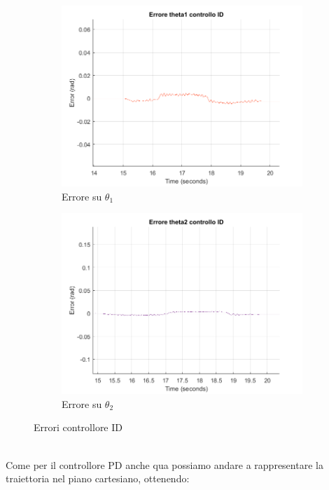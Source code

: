 \begin{figure}
\begin{subfigure}{.53\textwidth}
  \centering
  \includegraphics[width=.9\linewidth]{Immagini/Traiettorie/ErroreTheta1ID}  
  \caption{Errore su $\theta_1$}
  \label{fig:sub-pd3k}
\end{subfigure}
\begin{subfigure}{.5\textwidth}
  \centering
  \includegraphics[width=.9\linewidth]{Immagini/Traiettorie/ErroreTheta2ID}  
  \caption{Errore su $\theta_2$}
  \label{fig:sub-pd4}
\end{subfigure}
\caption{Errori controllore ID}
\label{fig:AndamentiID}
\end{figure}
\\Come per il controllore PD anche qua possiamo andare a rappresentare la traiettoria nel piano cartesiano, ottenendo:
